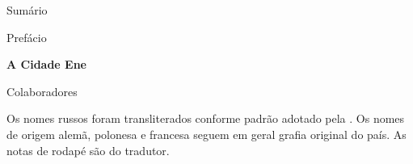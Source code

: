 \thispagestyle{empty}
\MyriadPro
Sumário

\hspace{2cm}{\Georgia{\pageref{prefacio}}} \hspace{.65cm} Prefácio 

\medskip

\hspace{2cm}{\Georgia{\pageref{cidade}}} \hspace{.4cm} \textbf{A Cidade Ene} 

\medskip

\hspace{2cm}{\Georgia{\pageref{colaboradores}}} \hspace{.2cm} Colaboradores

\pagebreak
\thispagestyle{empty}

\begin{vplace}[30]
\begin{centering}
Os nomes russos foram transliterados conforme padrão adotado pela \scalebox{0.8}{USP}.
Os nomes de origem alemã, polonesa e francesa seguem em geral grafia original do país.
As notas de rodapé são do tradutor.
\end{centering}
\end{vplace}
\thispagestyle{empty}